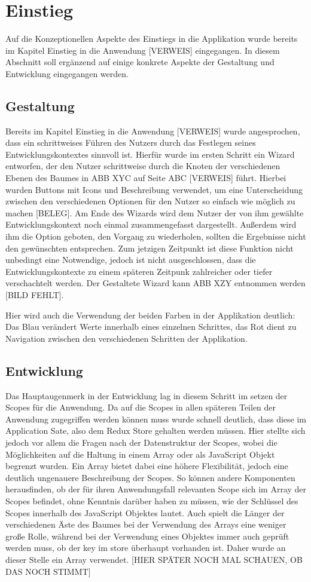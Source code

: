 \section{Einstieg}
Auf die Konzeptionellen Aspekte des Einstiegs in die Applikation wurde bereits im Kapitel Einstieg in die Anwendung [VERWEIS] eingegangen. In diesem Abschnitt soll ergänzend  auf einige konkrete Aspekte der Gestaltung und Entwicklung eingegangen werden.

\subsection{Gestaltung}
Bereits im Kapitel Einstieg in die Anwendung [VERWEIS] wurde angesprochen, dass ein schrittweises Führen des Nutzers durch das Festlegen seines Entwicklungskontextes sinnvoll ist.
Hierfür wurde im ersten Schritt ein Wizard entworfen, der den Nutzer schrittweise durch die Knoten der verschiedenen Ebenen des Baumes in ABB XYC auf Seite ABC [VERWEIS]  führt.
Hierbei wurden Buttons mit Icons und Beschreibung verwendet, um eine Unterscheidung zwischen den verschiedenen Optionen für den Nutzer so einfach wie möglich zu machen [BELEG].
Am Ende des Wizards wird dem Nutzer der von ihm gewählte Entwicklungskontext noch einmal zusammengefasst dargestellt. Außerdem wird ihm die Option geboten, den Vorgang zu wiederholen, sollten die Ergebnisse nicht den gewünschten entsprechen.  Zum jetzigen Zeitpunkt ist  diese Funktion nicht unbedingt eine Notwendige, jedoch ist nicht ausgeschlossen, dass die Entwicklungskontexte zu einem späteren Zeitpunk zahlreicher oder tiefer verschachtelt werden.
Der Gestaltete Wizard kann ABB XZY entnommen werden [BILD FEHLT].

Hier wird auch die Verwendung der beiden Farben in der Applikation deutlich: Das Blau verändert Werte innerhalb eines einzelnen Schrittes, das Rot dient zu Navigation zwischen den verschiedenen Schritten der Applikation.

\subsection{Entwicklung}
Das Hauptaugenmerk in der Entwicklung lag in diesem Schritt im setzen der Scopes für die Anwendung. Da auf die Scopes in allen späteren Teilen der Anwendung zugegriffen werden können muss wurde schnell deutlich, dass diese im Application Sate, also dem Redux Store gehalten werden müssen. Hier stellte sich jedoch vor allem die Fragen nach der Datenstruktur der Scopes, wobei die Möglichkeiten auf die Haltung in einem Array oder als JavaScript Objekt begrenzt wurden.
Ein Array bietet dabei eine höhere Flexibilität, jedoch eine deutlich ungenauere Beschreibung der Scopes. So können andere Komponenten herausfinden, ob der für ihren Anwendungsfall relevanten Scope sich im Array der Scopes befindet, ohne Kenntnis darüber haben zu müssen, wie der Schlüssel des Scopes innerhalb des JavaScript Objektes lautet. Auch spielt die Länger der verschiedenen Äste des Baumes bei der Verwendung des Arrays eine weniger große Rolle, während bei der Verwendung eines Objektes immer auch geprüft werden muss, ob der key im store überhaupt vorhanden ist. Daher wurde an dieser Stelle ein Array verwendet.
[HIER SPÄTER NOCH MAL SCHAUEN, OB DAS NOCH STIMMT]

